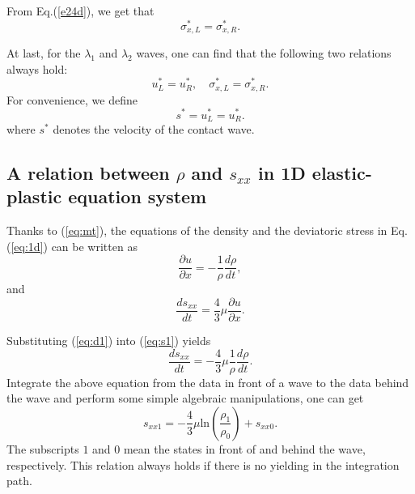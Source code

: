 \documentclass[review]{elsarticle}
\begin{document}

From  Eq.(\ref{e24d}), we  get that
\begin{equation}   \label{e27a}
\sigma_{x,L} ^{\ast}=  \sigma_{x,R} ^{\ast}.
\end{equation}


At last, for the $\lambda_{1}$ and $\lambda_{2}$ waves, one can find
that the following two relations always hold:
\begin{equation}   \label{e28}
u_{L}^{\ast}=u_{R}^{\ast}, \quad
\sigma_{x,L}^{\ast}=\sigma_{x,R}^{\ast}.
\end{equation}
For convenience, we define
\begin{equation}\label{eq:contact}
  s^* = u_L^* = u_R^*. %
\end{equation}
where $s^*$ denotes the velocity of the contact wave.
\subsection{A relation between $\rho$ and $s_{xx}$ in 1D elastic-plastic  equation system}

Thanks to (\ref{eq:mt}), the equations of the density and the deviatoric stress in Eq.(\ref{eq:1d}) can be written as
  \begin{equation}\label{eq:d1}
    \frac{\partial u}{\partial x} = -\frac{1}{\rho}\frac{d\rho}{dt},
  \end{equation}
  and
  \begin{equation}\label{eq:s1}
    \frac{ds_{xx}}{dt}=\frac{4}{3}\mu\frac{\partial u}{\partial x}.
  \end{equation}

  Substituting (\ref{eq:d1}) into (\ref{eq:s1}) yields
  \begin{equation}
    \frac{ds_{xx}}{dt}=-\frac{4}{3}\mu \frac{1}{\rho}\frac{d\rho}{dt}.
\end{equation}
Integrate the above equation from the data in front of a wave to the data behind the wave and perform some simple algebraic manipulations, one can get
\begin{equation}\label{eq:rhosxx}
  s_{xx1}=-\frac{4}{3}\mu\text{ln}(\frac{\rho_{1}}{\rho_{0}})+s_{xx0}.
\end{equation}
The subscripts $1$ and $0$ mean the states in front of and behind the wave, respectively.
This relation always holds if there is no yielding in the integration path.
\end{document}

